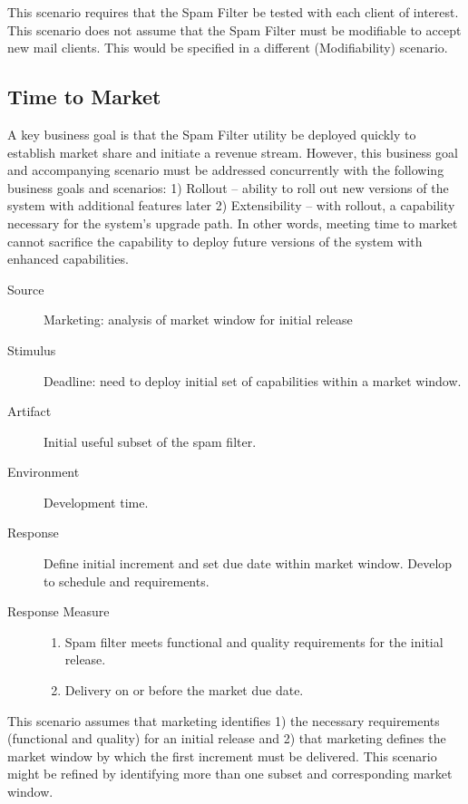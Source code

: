\documentclass[letterpaper,11pt]{article}
\begin{document}
This scenario requires that the Spam Filter be tested with each client of
interest. This scenario does not assume that the Spam Filter must be
modifiable to accept new mail clients. This would be specified in a different
(Modifiability) scenario.

\subsection{Time to Market}
A key business goal is that the Spam Filter utility be deployed quickly to
establish market share and initiate a revenue stream. However, this business
goal and accompanying scenario must be addressed concurrently with the
following business goals and scenarios: 1) Rollout – ability to roll out new
versions of the system with additional features later 2) Extensibility – with
rollout, a capability necessary for the system’s upgrade path. In other words,
meeting time to market cannot sacrifice the capability to deploy future
versions of the system with enhanced capabilities.

\begin{description}
\item[Source] Marketing: analysis of market window for initial release
\item[Stimulus] Deadline: need to deploy initial set of capabilities within a
  market window.
\item[Artifact] Initial useful subset of the spam filter.
\item[Environment] Development time.
\item[Response] Define initial increment and set due date within market
  window.  Develop to schedule and requirements.
\item[Response Measure] \hfill
  \begin{enumerate}
  \item Spam filter meets functional and quality requirements for the initial
    release.
  \item Delivery on or before the market due date.
  \end{enumerate}
\end{description}
 
This scenario assumes that marketing identifies 1) the necessary requirements
(functional and quality) for an initial release and 2) that marketing defines
the market window by which the first increment must be delivered. This
scenario might be refined by identifying more than one subset and
corresponding market window.
 
\end{document}
